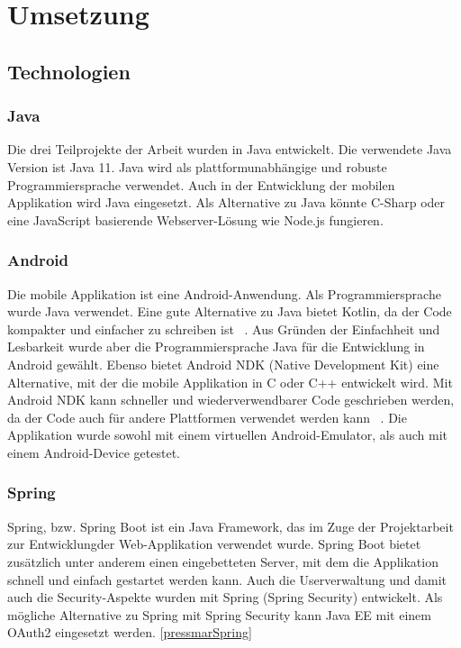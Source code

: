 \chapter{Umsetzung}
\label{chap:Umsetzung}

\section{Technologien}
\subsection{Java}
Die drei Teilprojekte der Arbeit wurden in Java entwickelt. Die verwendete Java Version ist Java 11. Java wird als plattformunabhängige und robuste Programmiersprache verwendet. Auch in der Entwicklung der mobilen Applikation wird Java eingesetzt. Als Alternative zu Java könnte C-Sharp oder eine JavaScript basierende Webserver-Lösung wie Node.js fungieren.
\subsection{Android}
Die mobile Applikation ist eine Android-Anwendung. Als Programmiersprache wurde Java verwendet. Eine gute Alternative zu Java bietet Kotlin, da der Code kompakter und einfacher zu schreiben ist ~\parencite{banerjee2018comparative}. Aus Gründen der Einfachheit und Lesbarkeit wurde aber die Programmiersprache Java für die Entwicklung in Android gewählt. Ebenso bietet Android NDK (Native Development Kit) eine Alternative, mit der die mobile Applikation in C oder C++ entwickelt wird. Mit Android NDK kann schneller und wiederverwendbarer Code geschrieben werden, da der Code auch für andere Plattformen verwendet werden kann ~\parencite{ratabouil2015android}. Die Applikation wurde sowohl mit einem virtuellen Android-Emulator, als auch mit einem Android-Device getestet.
\subsection{Spring}
Spring, bzw. Spring Boot ist ein Java Framework, das im Zuge der Projektarbeit zur Entwicklungder Web-Applikation verwendet wurde. Spring Boot bietet zusätzlich unter anderem einen eingebetteten Server,  mit dem die Applikation schnell und einfach gestartet werden kann. Auch die Userverwaltung und damit auch die Security-Aspekte wurden mit Spring (Spring Security) entwickelt. Als mögliche Alternative zu Spring mit Spring Security kann Java EE mit einem OAuth2 eingesetzt werden. \ref{pressmarSpring}
